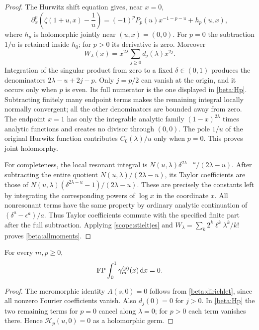 \begin{proof}
The Hurwitz shift equation gives, near $x=0$,
\begin{equation}\label{beta:local}
 \partial_x^p\left(\zeta(1+u,x)-\frac1u\right)
 =(-1)^pP_p(u)x^{-1-p-u}+h_p(u,x),
\end{equation}
where $h_p$ is holomorphic jointly near $(u,x)=(0,0)$.
For $p=0$ the subtraction $1/u$ is retained inside $h_0$;
for $p>0$ its derivative is zero. Moreover
\[
 W_\lambda(x)=x^{2\lambda}\sum_{j\geq0}d_j(\lambda)x^{2j}.
\]
Integration of the singular product from zero to a fixed
$\delta\in(0,1)$ produces the denominators
$2\lambda-u+2j-p$. Only $j=p/2$ can vanish at the origin, and it
occurs only when $p$ is even. Its full numerator is the one displayed
in \eqref{beta:Hp}. Subtracting finitely many endpoint terms makes
the remaining integral locally normally convergent; all the other
denominators are bounded away from zero. The endpoint $x=1$ has only
the integrable analytic family $(1-x)^{2\lambda}$ times analytic
functions and creates no divisor through $(0,0)$. The pole $1/u$ of
the original Hurwitz function contributes $C_0(\lambda)/u$ only
when $p=0$. This proves joint holomorphy.

For completeness, the local resonant integral is
$N(u,\lambda)\delta^{2\lambda-u}/(2\lambda-u)$. After subtracting
the entire quotient $N(u,\lambda)/(2\lambda-u)$, its Taylor
coefficients are those of
$N(u,\lambda)(\delta^{2\lambda-u}-1)/(2\lambda-u)$.
These are precisely the constants left by integrating the corresponding
powers of $\log x$ in the coordinate $x$. All nonresonant terms have
the same property by ordinary analytic continuation of
$(\delta^a-\epsilon^a)/a$. Thus Taylor coefficients commute with the
specified finite part after the full subtraction. Applying
\eqref{scope:stieltjes} and
$W_\lambda=\sum_k2^k\ell^k\lambda^k/k!$ proves
\eqref{beta:allmoments}.
\end{proof}

\begin{corollary}\label{beta:zero}
For every $m,p\geq0$,
\[
 \operatorname{FP}\int_0^1\gamma_m^{(p)}(x)\,\mathrm d x=0.
\]
\end{corollary}
\begin{proof}
The meromorphic identity $A(s,0)=0$ follows from
\eqref{beta:dirichlet}, since all nonzero Fourier coefficients
vanish. Also $d_j(0)=0$ for $j>0$. In \eqref{beta:Hp} the two
remaining terms for $p=0$ cancel along $\lambda=0$; for $p>0$ each
term vanishes there. Hence $\mathcal H_p(u,0)=0$ as a holomorphic
germ.
\end{proof}

